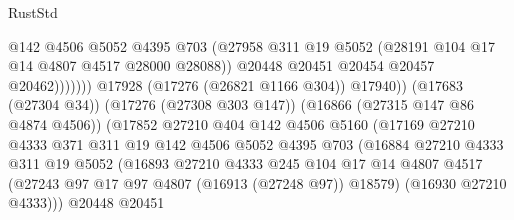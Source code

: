 \begin{lexlean}{RustStd}
\begin{coremodule}
                                              @142
                                              @4506
                                              @5052
                                              @4395
                                              @703
                                              (@27958
                                                @311
                                                @19
                                                @5052
                                                (@28191 @104 @17 @14 @4807 @4517 @28000 @28088))
                                              @20448
                                              @20451
                                              @20454
                                              @20457
                                              @20462)))))))
                                @17928
                                (@17276 (@26821 @1166 @304))
                                @17940))
                            (@17683 (@27304 @34))
                            (@17276 (@27308 @303 @147))
                            (@16866 (@27315 @147 @86 @4874 @4506))
                            (@17852
                              @27210
                              @404
                              @142
                              @4506
                              @5160
                              (@17169
                                @27210
                                @4333
                                @371
                                @311
                                @19
                                @142
                                @4506
                                @5052
                                @4395
                                @703
                                (@16884
                                  @27210
                                  @4333
                                  @311
                                  @19
                                  @5052
                                  (@16893
                                    @27210
                                    @4333
                                    @245
                                    @104
                                    @17
                                    @14
                                    @4807
                                    @4517
                                    (@27243 @97 @17 @97 @4807 (@16913 (@27248 @97)) @18579)
                                    (@16930 @27210 @4333)))
                                @20448
                                @20451

\end{coremodule}
\end{lexlean}
